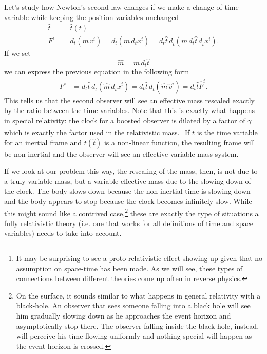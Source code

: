 Let's study how Newton's second law changes if we make a change of time variable while keeping the position variables unchanged
\begin{equation}
	\begin{aligned}
		\hat{t}&=\hat{t}(t) \\
		F^i &= d_t  (m \, v^i) = d_t  (m \, d_t x^i) = d_t \hat{t} \, d_{\hat{t}}  (m \, d_t \hat{t} \, d_{\hat{t}} x^i).
	\end{aligned}
\end{equation}
If we set
\begin{equation}
	\hat{m} = m \, d_t \hat{t}
\end{equation}
we can express the previous equation in the following form
\begin{equation}
	\begin{aligned}
		F^i &= d_t \hat{t} \, d_{\hat{t}}  (\hat{m} \, d_{\hat{t}} x^i) = d_t \hat{t} \, d_{\hat{t}}  (\hat{m} \, \hat{v}^i) = d_t \hat{t} \hat{F}^i.
	\end{aligned}
\end{equation}
This tells us that the second observer will see an effective mass rescaled exactly by the ratio between the time variables. Note that this is exactly what happens in special relativity: the clock for a boosted observer is dilated by a factor of $\gamma$ which is exactly the factor used in the relativistic mass.\footnote{It may be surprising to see a proto-relativistic effect showing up given that no assumption on space-time has been made. As we will see, these types of connections between different theories come up often in reverse physics.} If $t$ is the time variable for an inertial frame and $t(\hat{t})$ is a non-linear function, the resulting frame will be non-inertial and the observer will see an effective variable mass system.

If we look at our problem this way, the rescaling of the mass, then, is not due to a truly variable mass, but a variable effective mass due to the slowing down of the clock. The body slows down because the non-inertial time is slowing down and the body appears to stop because the clock becomes infinitely slow. While this might sound like a contrived case,\footnote{On the surface, it sounds similar to what happens in general relativity with a black-hole. An observer that sees someone falling into a black hole will see him gradually slowing down as he approaches the event horizon and asymptotically stop there. The observer falling inside the black hole, instead, will perceive his time flowing uniformly and nothing special will happen as the event horizon is crossed.} these are exactly the type of situations a fully relativistic theory (i.e. one that works for all definitions of time and space variables) needs to take into account.

